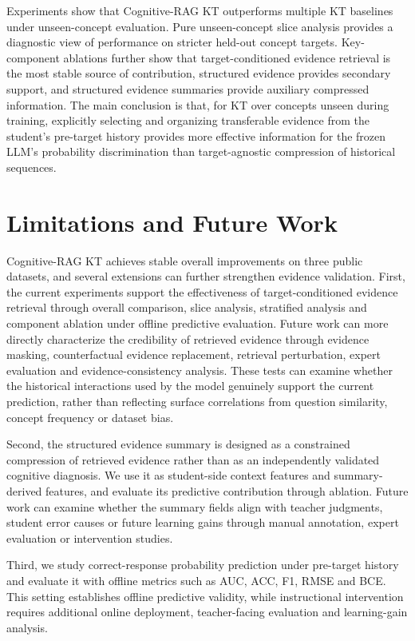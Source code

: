 \documentclass[a4paper,12pt]{article}
\numberwithin{table}{section}
\begin{document}
Experiments show that Cognitive-RAG KT outperforms multiple KT baselines under unseen-concept evaluation. Pure unseen-concept slice analysis provides a diagnostic view of performance on stricter held-out concept targets. Key-component ablations further show that target-conditioned evidence retrieval is the most stable source of contribution, structured evidence provides secondary support, and structured evidence summaries provide auxiliary compressed information. The main conclusion is that, for KT over concepts unseen during training, explicitly selecting and organizing transferable evidence from the student's pre-target history provides more effective information for the frozen LLM's probability discrimination than target-agnostic compression of historical sequences.

\section{Limitations and Future Work}

Cognitive-RAG KT achieves stable overall improvements on three public datasets, and several extensions can further strengthen evidence validation. First, the current experiments support the effectiveness of target-conditioned evidence retrieval through overall comparison, slice analysis, stratified analysis and component ablation under offline predictive evaluation. Future work can more directly characterize the credibility of retrieved evidence through evidence masking, counterfactual evidence replacement, retrieval perturbation, expert evaluation and evidence-consistency analysis. These tests can examine whether the historical interactions used by the model genuinely support the current prediction, rather than reflecting surface correlations from question similarity, concept frequency or dataset bias.

Second, the structured evidence summary is designed as a constrained compression of retrieved evidence rather than as an independently validated cognitive diagnosis. We use it as student-side context features and summary-derived features, and evaluate its predictive contribution through ablation. Future work can examine whether the summary fields align with teacher judgments, student error causes or future learning gains through manual annotation, expert evaluation or intervention studies.

Third, we study correct-response probability prediction under pre-target history and evaluate it with offline metrics such as AUC, ACC, F1, RMSE and BCE. This setting establishes offline predictive validity, while instructional intervention requires additional online deployment, teacher-facing evaluation and learning-gain analysis.
\end{document}
